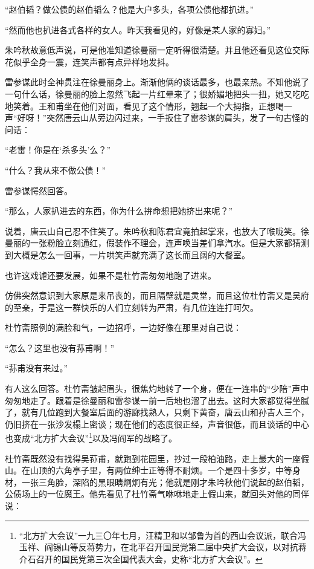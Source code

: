 \par “赵伯韬？做公债的赵伯韬么？他是大户多头，各项公债他都扒进。”
\par “然而他也扒进各式各样的女人。昨天我看见的，好像是某人家的寡妇。”
\par 朱吟秋故意低声说，可是他准知道徐曼丽一定听得很清楚。并且他还看见这位交际花似乎全身一震，连笑声都有点异样地发抖。
\par 雷参谋此时全神贯注在徐曼丽身上。渐渐他俩的谈话最多，也最亲热。不知他说了一句什么话，徐曼丽的脸上忽然飞起一片红晕来了；很娇媚地把头一扭，她又吃吃地笑着。王和甫坐在他们对面，看见了这个情形，翘起一个大拇指，正想喝一声“好呀！”突然唐云山从旁边闪过来，一手扳住了雷参谋的肩头，发了一句古怪的问话：
\par “老雷！你是在‘杀多头’么？”
\par “什么？我从来不做公债！”
\par 雷参谋愕然回答。
\par “那么，人家扒进去的东西，你为什么拚命想把她挤出来呢？”
\par 说着，唐云山自己忍不住笑了。朱吟秋和陈君宜竟拍起掌来，也放大了喉咙笑。徐曼丽的一张粉脸立刻通红，假装作不理会，连声唤当差们拿汽水。但是大家都猜测到大概是怎么一回事，一片哄笑声就充满了这长而且阔的大餐室。
\par 也许这戏谑还要发展，如果不是杜竹斋匆匆地跑了进来。
\par 仿佛突然意识到大家原是来吊丧的，而且隔壁就是灵堂，而且这位杜竹斋又是吴府的至亲，于是这一群快乐的人们立刻转为严肃，有几位连连打呵欠。
\par 杜竹斋照例的满脸和气，一边招呼，一边好像在那里对自己说：
\par “怎么？这里也没有荪甫啊！”
\par “荪甫没有来过。”
\par 有人这么回答。杜竹斋皱起眉头，很焦灼地转了一个身，便在一连串的“少陪”声中匆匆地走了。跟着是徐曼丽和雷参谋一前一后地也溜了出去。这时大家都觉得坐腻了，就有几位跑到大餐室后面的游廊找熟人，只剩下黄奋，唐云山和孙吉人三个，仍旧挤在一张沙发榻上密谈；现在他们的态度很正经，声音很低，而且谈话的中心也变成“北方扩大会议”\footnote{“北方扩大会议”一九三〇年七月，汪精卫和以邹鲁为首的西山会议派，联合冯玉祥、阎锡山等反蒋势力，在北平召开国民党第二届中央扩大会议，以对抗蒋介石召开的国民党第三次全国代表大会，史称“北方扩大会议”。}以及冯阎军的战略了。
\par 杜竹斋既然没有找得吴荪甫，就跑到花园里，抄过一段柏油路，走上最大的一座假山。在山顶的六角亭子里，有两位绅士正等得不耐烦。一个是四十多岁，中等身材，一张三角脸，深陷的黑眼睛炯炯有光；他就是刚才朱吟秋他们说起的赵伯韬，公债场上的一位魔王。他先看见了杜竹斋气咻咻地走上假山来，就回头对他的同伴说：
